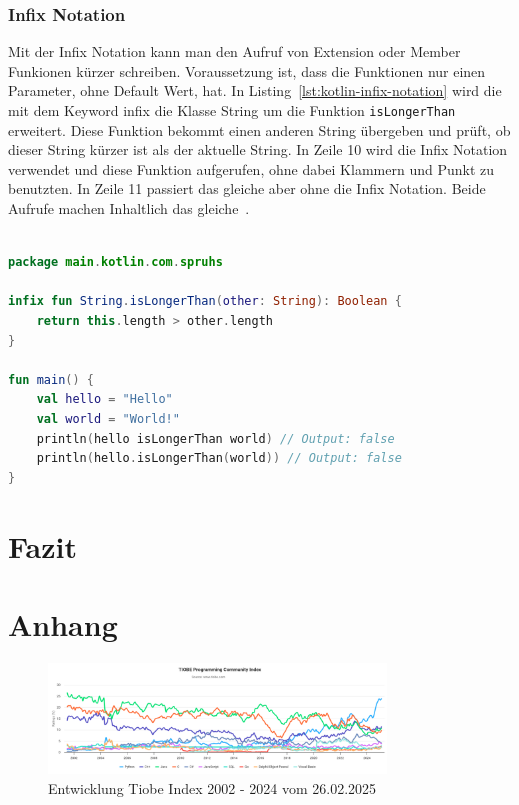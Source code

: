 \documentclass[11pt]{article}
\begin{document}
    \subsubsection{Infix Notation}
    Mit der Infix Notation kann man den Aufruf von Extension oder Member Funkionen kürzer schreiben.
    Voraussetzung ist, dass die Funktionen nur einen Parameter, ohne Default Wert, hat.
    In Listing~\ref{lst:kotlin-infix-notation} wird die mit dem Keyword infix die Klasse String um die Funktion \texttt{isLongerThan} erweitert.
    Diese Funktion bekommt einen anderen String übergeben und prüft, ob dieser String kürzer ist als der aktuelle String.
    In Zeile 10 wird die Infix Notation verwendet und diese Funktion aufgerufen, ohne dabei Klammern und Punkt zu benutzten.
    In Zeile 11 passiert das gleiche aber ohne die Infix Notation.
    Beide Aufrufe machen Inhaltlich das gleiche~\cite{kotlin-infix-notation}.\\
    \\

    \begin{lstlisting}[language=Kotlin, caption={InfixNotation.kt}, label={lst:kotlin-infix-notation}]
package main.kotlin.com.spruhs

infix fun String.isLongerThan(other: String): Boolean {
    return this.length > other.length
}

fun main() {
    val hello = "Hello"
    val world = "World!"
    println(hello isLongerThan world) // Output: false
    println(hello.isLongerThan(world)) // Output: false
}
    \end{lstlisting}

    \section{Fazit}

    \printbibliography[
        heading=bibintoc,
        title={Literaturverzeichnis}
    ]
    \appendix
    \section{Anhang}

    \begin{figure}[h]
        \centering
        \includegraphics[width=0.8\textwidth]{pictures/Screenshot 2025-02-26 at 19-53-49 TIOBE Index - TIOBE}
        \caption{Entwicklung Tiobe Index 2002 - 2024 vom 26.02.2025 }
        \label{fig:entwicklung-tiobe}
    \end{figure}
\end{document}

